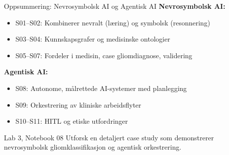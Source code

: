 \documentclass[aspectratio=169, 10pt]{beamer}
\begin{document}
\begin{frame}{Oppsummering: Nevrosymbolsk AI og Agentisk AI}
    \textbf{Nevrosymbolsk AI:}
    \begin{itemize}
        \item S01--S02: Kombinerer nevralt (læring) og symbolsk (resonnering)
        \item S03--S04: Kunnskapsgrafer og medisinske ontologier
        \item S05--S07: Fordeler i medisin, case gliomdiagnose, validering
    \end{itemize}
    
    \vspace{0.3cm}
    \textbf{Agentisk AI:}
    \begin{itemize}
        \item S08: Autonome, målrettede AI-systemer med planlegging
        \item S09: Orkestrering av kliniske arbeidsflyter
        \item S10--S11: HITL og etiske utfordringer
    \end{itemize}
    
    \vspace{0.3cm}
    \begin{block}{Lab 3, Notebook 08}
        Utforsk en detaljert case study som demonstrerer nevrosymbolsk gliomklassifikasjon og agentisk orkestrering.
    \end{block}
\end{frame}
\end{document}
